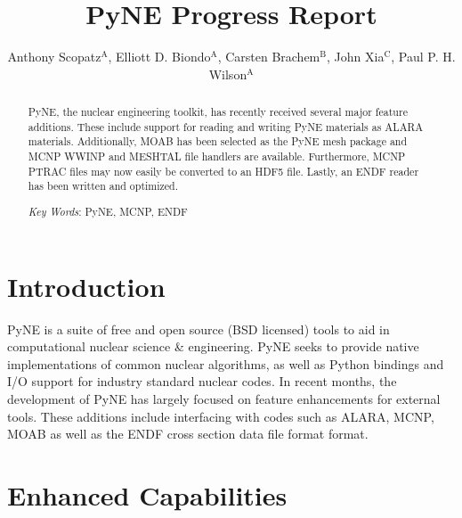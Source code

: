 \documentclass{ansconf}
\newcommand{\superscript}[1]{\ensuremath{^{\textrm{#1}}}}
\begin{document}
\title{PyNE Progress Report}

\author{Anthony Scopatz\superscript{A}, Elliott D. Biondo\superscript{A}, 
        Carsten Brachem\superscript{B}, John Xia\superscript{C}, 
        Paul P. H. Wilson\superscript{A}}

\maketitle

\begin{abstract}

PyNE, the nuclear engineering toolkit, has recently received several major
feature additions.  These include support for reading and writing PyNE materials 
as ALARA materials.  Additionally, MOAB has been selected as the PyNE mesh package
and MCNP WWINP and MESHTAL file handlers are available.  Furthermore, MCNP PTRAC files may now
easily be converted to an HDF5 file.  Lastly, an ENDF reader has been written and 
optimized.

\emph{Key Words}: PyNE, MCNP, ENDF
\end{abstract}

\setlength{\baselineskip}{11pt}


\section{Introduction}
\label{sec:intro}

PyNE is a suite of free and open source (BSD licensed) tools to aid in 
computational nuclear science \& engineering. PyNE seeks to provide native 
implementations of common nuclear algorithms, as well as Python bindings and 
I/O support for industry standard nuclear codes.  In recent months, the development 
of PyNE has largely focused on feature 
enhancements for external tools.  These additions include interfacing with 
codes such as ALARA, MCNP, MOAB as well as the ENDF cross section data
file format format.

\section{Enhanced Capabilities}
\end{document}
